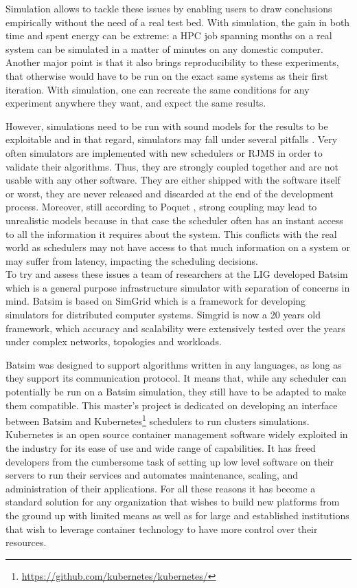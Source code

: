 Simulation allows to tackle these issues by enabling users to draw conclusions
empirically without the need of a real test bed. With simulation, the
gain in both time and spent energy can be extreme: a HPC job spanning months on
a real system can be simulated in a matter of minutes on any domestic computer.
Another major point is that it also brings reproducibility to these
experiments, that otherwise would have to be run on the exact same systems as
their first iteration. With simulation, one can recreate the same conditions
for any experiment anywhere they want, and expect the same results.

However, simulations need to be run with sound models for the results to be
exploitable and in that regard, simulators may fall under several pitfalls
\cite{poquet:tel-01757245}. Very often simulators are implemented with new
schedulers or RJMS in order to validate their algorithms. Thus, they are
strongly coupled together and are not usable with any other software. They are
either shipped with the software itself or worst, they are never released and
discarded at the end of the development process.  Moreover, still according to
Poquet \cite{poquet:tel-01757245}, strong coupling may lead to unrealistic
models because in that case the scheduler often has an instant access to all
the information it requires about the system. This conflicts with the real
world as schedulers may not have access to that much information on a system or
may suffer from latency, impacting the scheduling decisions.\\


To try and assess these issues a team of researchers at the LIG developed
Batsim \cite{dutot:hal-01333471} which is a general purpose infrastructure
simulator with separation of concerns in mind. Batsim is based on
SimGrid \cite{casanova:hal-01017319} which is a framework for developing
simulators for distributed computer systems. Simgrid is now a 20 years old
framework, which accuracy and scalability were extensively tested over the
years under complex networks, topologies and workloads. 

Batsim was designed to support algorithms written in any languages, as long as
they support its communication protocol. It means that, while any scheduler can
potentially be run on a Batsim simulation, they still have to be adapted to
make them compatible. This master's project is dedicated on developing an
interface between Batsim and
Kubernetes\footnote{\url{https://github.com/kubernetes/kubernetes/}} schedulers to
run clusters simulations. Kubernetes is an open source container management
software widely exploited in the industry for its ease of use and wide range of
capabilities.  It has freed developers from the cumbersome task of setting up
low level software on their servers to run their services and automates
maintenance, scaling, and administration of their applications.  For all these
reasons it has become a standard solution for any organization that wishes to
build new platforms from the ground up with limited means as well as for large
and established institutions that wish to leverage container technology to have
more control over their resources.\\

